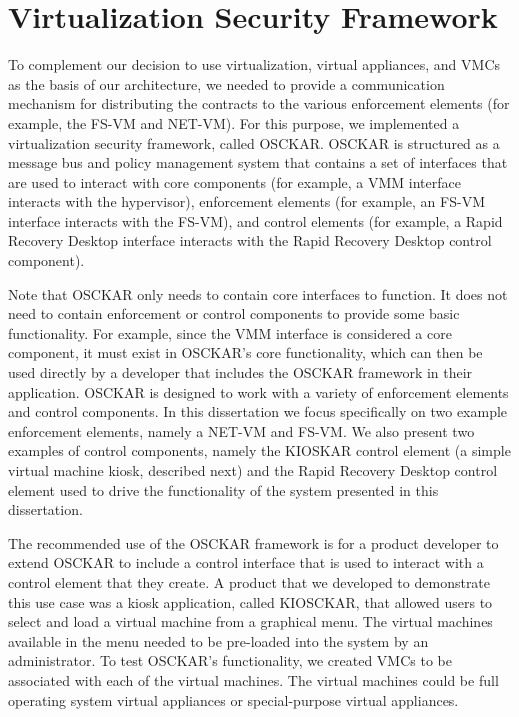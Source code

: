 \section{Virtualization Security Framework}

To complement our decision to use virtualization, virtual appliances, and VMCs as the basis of our architecture, we needed to provide a communication mechanism for distributing the contracts to the various enforcement elements (for example, the FS-VM and NET-VM). For this purpose, we implemented a virtualization security framework, called OSCKAR. OSCKAR is structured as a message bus and policy management system that contains a set of interfaces that are used to interact with core components (for example, a VMM interface interacts with the hypervisor), enforcement elements (for example, an FS-VM interface interacts with the FS-VM), and control elements (for example, a Rapid Recovery Desktop interface interacts with the Rapid Recovery Desktop control component).

Note that OSCKAR only needs to contain core interfaces to function. It does not need to contain enforcement or control components to provide some basic functionality. For example, since the VMM interface is considered a core component, it must exist in OSCKAR's core functionality, which can then be used directly by a developer that includes the OSCKAR framework in their application. OSCKAR is designed to work with a variety of enforcement elements and control components. In this dissertation we focus specifically on two example enforcement elements, namely a NET-VM and FS-VM. We also present two examples of control components, namely the KIOSKAR control element (a simple virtual machine kiosk, described next) and the Rapid Recovery Desktop control element used to drive the functionality of the system presented in this dissertation.

The recommended use of the OSCKAR framework is for a product developer to extend OSCKAR to include a control interface that is used to interact with a control element that they create. A product that we developed to demonstrate this use case was a kiosk application, called KIOSCKAR, that allowed users to select and load a virtual machine from a graphical menu. The virtual machines available in the menu needed to be pre-loaded into the system by an administrator. To test OSCKAR's functionality, we created VMCs to be associated with each of the virtual machines. The virtual machines could be full operating system virtual appliances or special-purpose virtual appliances.

